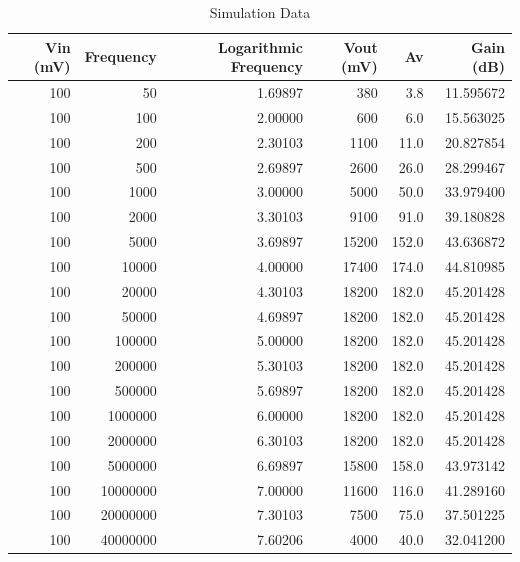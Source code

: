 \documentclass[12pt]{article}
\begin{document}
\begin{table}[h!]
    \centering
    \caption{Simulation Data}
    \begin{tabular}{rrrrrr}
        \hline
        Vin (mV) &  Frequency &  Logarithmic Frequency &  Vout (mV) &    Av &  Gain (dB) \\
        \hline
        100 &         50 &                1.69897 &        380 &   3.8 &  11.595672 \\
        100 &        100 &                2.00000 &        600 &   6.0 &  15.563025 \\
        100 &        200 &                2.30103 &       1100 &  11.0 &  20.827854 \\
        100 &        500 &                2.69897 &       2600 &  26.0 &  28.299467 \\
        100 &       1000 &                3.00000 &       5000 &  50.0 &  33.979400 \\
        100 &       2000 &                3.30103 &       9100 &  91.0 &  39.180828 \\
        100 &       5000 &                3.69897 &      15200 & 152.0 &  43.636872 \\
        100 &      10000 &                4.00000 &      17400 & 174.0 &  44.810985 \\
        100 &      20000 &                4.30103 &      18200 & 182.0 &  45.201428 \\
        100 &      50000 &                4.69897 &      18200 & 182.0 &  45.201428 \\
        100 &     100000 &                5.00000 &      18200 & 182.0 &  45.201428 \\
        100 &     200000 &                5.30103 &      18200 & 182.0 &  45.201428 \\
        100 &     500000 &                5.69897 &      18200 & 182.0 &  45.201428 \\
        100 &    1000000 &                6.00000 &      18200 & 182.0 &  45.201428 \\
        100 &    2000000 &                6.30103 &      18200 & 182.0 &  45.201428 \\
        100 &    5000000 &                6.69897 &      15800 & 158.0 &  43.973142 \\
        100 &   10000000 &                7.00000 &      11600 & 116.0 &  41.289160 \\
        100 &   20000000 &                7.30103 &       7500 &  75.0 &  37.501225 \\
        100 &   40000000 &                7.60206 &       4000 &  40.0 &  32.041200 \\
        \hline
    \end{tabular}
\end{table}
\end{document}

